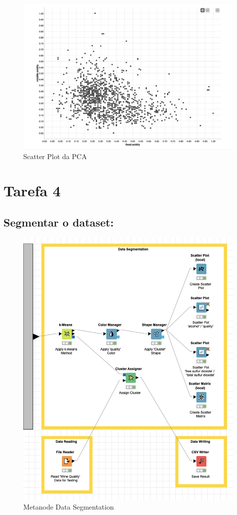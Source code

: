 \documentclass{article}
\begin{document}
\begin{figure}[H]
    \centering
    \includegraphics[scale=0.3]{Images/T3_b2.png}
    \caption{Scatter Plot da PCA}
\end{figure}

\clearpage

\section{Tarefa 4}

\subsection{Segmentar o dataset:}

\begin{figure}[H]
    \centering
    \includegraphics[scale=0.6]{Images/T4.png}
    \caption{Metanode Data Segmentation}
\end{figure}
\end{document}
